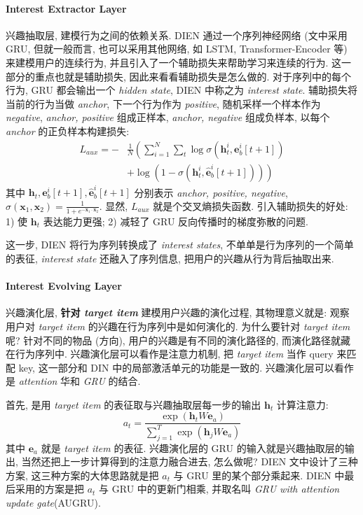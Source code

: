 \paragraph{Interest Extractor Layer}
兴趣抽取层, 建模行为之间的依赖关系. DIEN 通过一个序列神经网络 (文中采用 GRU, 但就一般而言, 也可以采用其他网络, 如 LSTM, Transformer-Encoder 等) 来建模用户的连续行为, 并且引入了一个辅助损失来帮助学习来连续的行为. 这一部分的重点也就是辅助损失, 因此来看看辅助损失是怎么做的. 对于序列中的每个行为, GRU 都会输出一个 \textit{hidden state}, DIEN 中称之为 \textit{interest state}. 辅助损失将当前的行为当做 \textit{anchor}, 下一个行为作为 \textit{positive}, 随机采样一个样本作为 \textit{negative}, \textit{anchor, positive} 组成正样本, \textit{anchor, negative} 组成负样本, 以每个 \textit{anchor} 的正负样本构建损失:
$$
\begin{aligned}
	L_{a u x}=-& \frac{1}{N}\left(\sum_{i=1}^{N} \sum_{t} \log \sigma\left(\mathbf{h}_{t}^{i}, \mathbf{e}_{b}^{i}[t+1]\right)\right.\\
	&\left.+\log \left(1-\sigma\left(\mathbf{h}_{t}^{i}, \hat{\mathbf{e}}_{b}^{i}[t+1]\right)\right)\right)
\end{aligned}
$$
其中 $\mathbf{h}_t, \mathbf{e}_b^i[t+1], \hat{\mathbf{e}}_b^i[t+1]$ 分别表示 \textit{anchor, positive, negative}, $\sigma(\mathbf{x}_1, \mathbf{x}_2) = \frac{1}{1 + e^{-\mathbf{x}_1 \cdot \mathbf{x}_2}}$. 显然, $L_{aux}$ 就是个交叉熵损失函数. 引入辅助损失的好处: 1) 使 $\mathbf{h}_t$ 表达能力更强; 2) 减轻了 GRU 反向传播时的梯度弥散的问题. 

这一步, DIEN 将行为序列转换成了 \textit{interest states}, 不单单是行为序列的一个简单的表征, \textit{interest state} 还融入了序列信息, 把用户的兴趣从行为背后抽取出来.


\paragraph{Interest Evolving Layer}
兴趣演化层, \textbf{针对 \textit{target item}} 建模用户兴趣的演化过程, 其物理意义就是: 观察用户对 \textit{target item} 的兴趣在行为序列中是如何演化的. 为什么要针对 \textit{target item} 呢? 针对不同的物品 (方向), 用户的兴趣是有不同的演化路径的, 而演化路径就藏在行为序列中. 兴趣演化层可以看作是注意力机制, 把 \textit{target item} 当作 query 来匹配 key, 这一部分和 DIN 中的局部激活单元的功能是一致的. 兴趣演化层可以看作是 \textit{attention} 华和 \textit{GRU} 的结合.

首先, 是用 \textit{target item} 的表征取与兴趣抽取层每一步的输出 $\mathbf{h}_t$ 计算注意力:
$$
a_{t}=\frac{\exp \left(\mathbf{h}_{t} W \mathbf{e}_{a}\right)}{\sum_{j=1}^{T} \exp \left(\mathbf{h}_{j} W \mathbf{e}_{a}\right)}
$$
其中 $\mathbf{e}_a$ 就是 \textit{target item} 的表征. 兴趣演化层的 GRU 的输入就是兴趣抽取层的输出, 当然还把上一步计算得到的注意力融合进去, 怎么做呢? DIEN 文中设计了三种方案, 这三种方案的大体思路就是把 $a_t$ 与 GRU 里的某个部分乘起来. DIEN 中最后采用的方案是把 $a_t$ 与 GRU 中的更新门相乘, 并取名叫 \textit{GRU with attention update gate}(AUGRU). 

